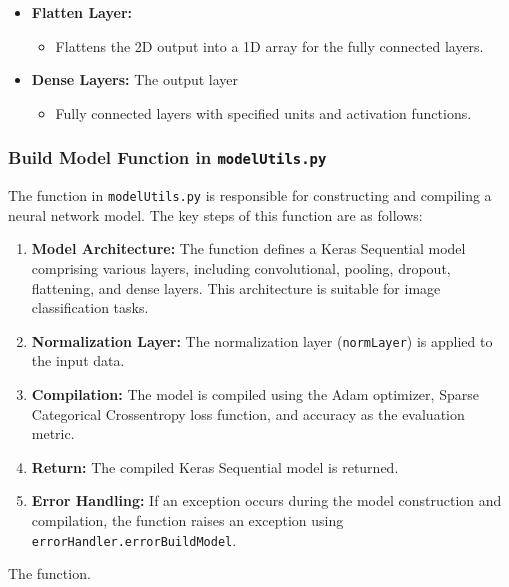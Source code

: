 \begin{itemize}
	\item \textbf{Flatten Layer:}
	\begin{itemize}
		\item Flattens the 2D output into a 1D array for the fully connected layers.
	\end{itemize}
	
	\item \textbf{Dense Layers:} The output layer
	\begin{itemize}
		\item Fully connected layers with specified units and activation functions.
	\end{itemize}
\end{itemize}

\subsubsection{Build Model Function in \texttt{modelUtils.py}}

The  function in \texttt{modelUtils.py} is responsible for constructing and compiling a neural network model. The key steps of this function are as follows:

\begin{enumerate}
	\item \textbf{Model Architecture:} The function defines a Keras Sequential model comprising various layers, including convolutional, pooling, dropout, flattening, and dense layers. This architecture is suitable for image classification tasks.
	
	\item \textbf{Normalization Layer:} The normalization layer (\texttt{normLayer}) is applied to the input data.
	
	\item \textbf{Compilation:} The model is compiled using the Adam optimizer, Sparse Categorical Crossentropy loss function, and accuracy as the evaluation metric.
	
	\item \textbf{Return:} The compiled Keras Sequential model is returned.
	
	\item \textbf{Error Handling:} If an exception occurs during the model construction and compilation, the function raises an exception using \texttt{errorHandler.errorBuildModel}.
\end{enumerate}


\begin{code}[h!]
	    
	
	\caption{The  function.}
	\label{code:buildModel}
\end{code}


